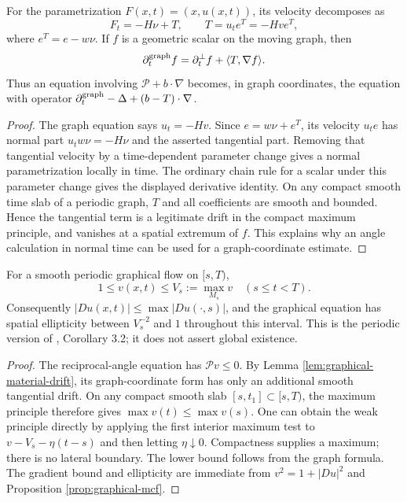 \begin{lemma}\label{lem:graphical-material-drift}
For the parametrization $F(x,t)=(x,u(x,t))$, its velocity decomposes as
\[
 F_t=-H\nu+T,\qquad T=u_t e^T=-Hv e^T,
\]
where $e^T=e-w\nu$. If $f$ is a geometric scalar on the moving graph, then
\[
 \partial_t^{\rm graph}f=\partial_t^\perp f+\langle T,\nabla f\rangle.
\]
Thus an equation involving $\mathcal P+b\cdot\nabla$ becomes, in graph coordinates, the equation with operator
$\partial_t^{\rm graph}-\Delta+(b-T)\cdot\nabla$.
\end{lemma}
\begin{proof}
The graph equation says $u_t=-Hv$. Since $e=w\nu+e^T$, its velocity $u_te$ has normal part $u_tw\nu=-H\nu$ and the asserted tangential part. Removing that tangential velocity by a time-dependent parameter change gives a normal parametrization locally in time. The ordinary chain rule for a scalar under this parameter change gives the displayed derivative identity. On any compact smooth time slab of a periodic graph, $T$ and all coefficients are smooth and bounded. Hence the tangential term is a legitimate drift in the compact maximum principle, and vanishes at a spatial extremum of $f$. This explains why an angle calculation in normal time can be used for a graph-coordinate estimate.
\end{proof}

\begin{proposition}\label{prop:periodic-graph-slope-bound}
For a smooth periodic graphical flow on $[s,T)$,
\[
 1\leq v(x,t)\leq V_s:=\max_{M_s}v\quad(s\leq t<T).
\]
Consequently $|Du(x,t)|\leq\max|Du(\cdot,s)|$, and the graphical equation has spatial ellipticity between $V_s^{-2}$ and $1$ throughout this interval. This is the periodic version of \cite{EH89}, Corollary 3.2; it does not assert global existence.
\end{proposition}
\begin{proof}
The reciprocal-angle equation has $\mathcal Pv\leq0$. By Lemma \ref{lem:graphical-material-drift}, its graph-coordinate form has only an additional smooth tangential drift. On any compact smooth slab $[s,t_1]\subset[s,T)$, the maximum principle therefore gives $\max v(t)\leq\max v(s)$. One can obtain the weak principle directly by applying the first interior maximum test to $v-V_s-\eta(t-s)$ and then letting $\eta\downarrow0$. Compactness supplies a maximum; there is no lateral boundary. The lower bound follows from the graph formula. The gradient bound and ellipticity are immediate from $v^2=1+|Du|^2$ and Proposition \ref{prop:graphical-mcf}.
\end{proof}

